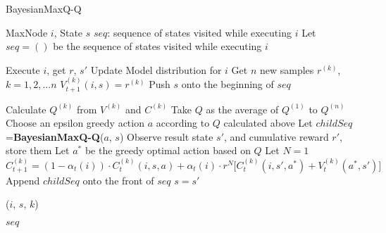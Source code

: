 \documentclass{article}
\begin{document}
\begin{algorithm}[t]
\caption{BayesianMaxQ-Q} \label{fig:MBBHRL}
\begin{algorithmic}[1]
\REQUIRE MaxNode $i$, State $s$
\ENSURE $seq$: sequence of states visited while executing $i$
\STATE Let $seq=()$ be the sequence of states visited while executing $i$

\STATE Execute $i$, get $r$, $s'$
\STATE Update Model distribution for $i$
\STATE Get $n$ new samples $r^{(k)}$, $k=1, 2, ... n$
\STATE $V_{t+1}^{(k)}(i,s) = r^{(k)}$
\ENDFOR
\STATE Push $s$ onto the beginning of $seq$

\ELSE
{}
\STATE Calculate $Q^{(k)}$ from $V^{(k)}$ and $C^{(k)}$
\ENDFOR
\STATE Take $Q$ as the average of $Q^{(1)}$ to $Q^{(n)}$
\STATE Choose an epsilon greedy action $a$ according to $Q$ calculated above
\STATE Let $childSeq$={\bf BayesianMaxQ-Q}($a$, $s$)
\STATE Observe result state $s'$, and cumulative reward $r'$, store them
\STATE Let $a^*$ be the greedy optimal action based on $Q$
\STATE Let $N=1$
\STATE $C_{t+1}^{(k)}=(1-\alpha_t(i))\cdot C_t^{(k)}(i,s,a) + \alpha_t(i)\cdot r^N\bigl[C_t^{(k)}(i,s',a^*)+V_t^{(k)}(a^*,s') \bigr]$
\ENDFOR
\ENDFOR
\STATE Append $childSeq$ onto the front of $seq$
\STATE $s=s'$
\ENDWHILE

($i$, $s$, $k$)
\ENDFOR

\RETURN $seq$
\ENDIF

\end{algorithmic}
\end{algorithm} 

\end{document}
